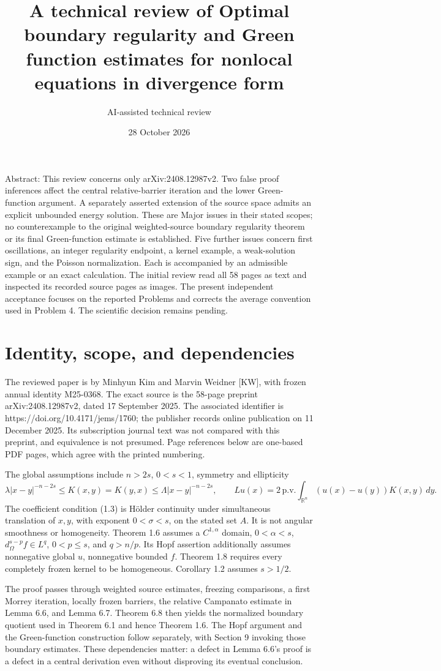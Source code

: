 \documentclass[10pt]{article}
\title{A technical review of
Optimal boundary regularity and Green function estimates for nonlocal equations in divergence form}
\author{AI-assisted technical review}
\date{28 October 2026}
\begin{document}
\maketitle
Abstract: This review concerns only arXiv:2408.12987v2. Two false proof inferences affect the central relative-barrier iteration and the lower Green-function argument. A separately asserted extension of the source space admits an explicit unbounded energy solution. These are Major issues in their stated scopes; no counterexample to the original weighted-source boundary regularity theorem or its final Green-function estimate is established. Five further issues concern first oscillations, an integer regularity endpoint, a kernel example, a weak-solution sign, and the Poisson normalization. Each is accompanied by an admissible example or an exact calculation. The initial review read all 58 pages as text and inspected its recorded source pages as images. The present independent acceptance focuses on the reported Problems and corrects the average convention used in Problem 4. The scientific decision remains pending.\par
\section*{Identity, scope, and dependencies}
The reviewed paper is by Minhyun Kim and Marvin Weidner [KW], with frozen annual identity M25-0368. The exact source is the 58-page preprint arXiv:2408.12987v2, dated 17 September 2025. The associated identifier is https://doi.org/10.4171/jems/1760; the publisher records online publication on 11 December 2025. Its subscription journal text was not compared with this preprint, and equivalence is not presumed. Page references below are one-based PDF pages, which agree with the printed numbering.\par
The global assumptions include \(n>2s\), \(0<s<1\), symmetry and ellipticity \[\lambda |x-y|^{-n-2s}\le K(x,y)=K(y,x)\le\Lambda|x-y|^{-n-2s},
 \qquad Lu(x)=2\,\mathrm{p.v.}\!\int_{\mathbb R^n}(u(x)-u(y))K(x,y)\,dy.\] The coefficient condition (1.3) is Hölder continuity under simultaneous translation of \(x,y\), with exponent \(0<\sigma<s\), on the stated set \(A\). It is not angular smoothness or homogeneity. Theorem 1.6 assumes a \(C^{1,\alpha}\) domain, \(0<\alpha<s\), \(d_\Omega^{s-p}f\in L^q\), \(0<p\le s\), and \(q>n/p\). Its Hopf assertion additionally assumes nonnegative global \(u\), nonnegative bounded \(f\). Theorem 1.8 requires every completely frozen kernel to be homogeneous. Corollary 1.2 assumes \(s>1/2\).\par
The proof passes through weighted source estimates, freezing comparisons, a first Morrey iteration, locally frozen barriers, the relative Campanato estimate in Lemma 6.6, and Lemma 6.7. Theorem 6.8 then yields the normalized boundary quotient used in Theorem 6.1 and hence Theorem 1.6. The Hopf argument and the Green-function construction follow separately, with Section 9 invoking those boundary estimates. These dependencies matter: a defect in Lemma 6.6’s proof is a defect in a central derivation even without disproving its eventual conclusion.\par
\end{document}
